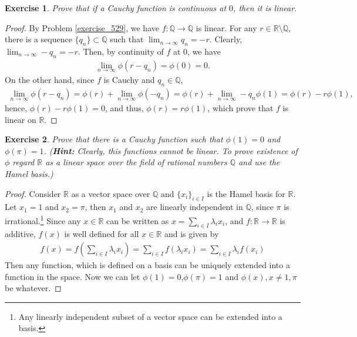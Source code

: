 \documentclass[11pt]{book}
\newtheorem{exercise}{Exercise}[section]
\theoremstyle{definition}
\numberwithin{equation}{chapter}
\begin{document}
\medskip

\begin{exercise}\label{exercise_5210}
Prove that if a Cauchy function is continuous at $0$, then it is linear.
\end{exercise}
\begin{proof}
By Problem \ref{exercise_529}, we have $f: \mathbb{Q} \to \mathbb{Q}$ is linear. For any $r \in \mathbb{R} \setminus \mathbb{Q}$, there is a sequence $\{q_n\} \subset \mathbb{Q}$ such that $\lim_{n\to\infty} q_n = - r$. Clearly, $\lim_{n\to\infty} -q_n = - r$. Then, by continuity of $f$ at $0$, we have
\begin{align*}
    \lim_{n\to\infty} \phi(r - q_n) = \phi(0) = 0.
\end{align*}
On the other hand, since $f$ is Cauchy and $q_n \in \mathbb{Q}$,
\begin{align*}
    \lim_{n\to\infty} \phi(r - q_n) = \phi(r) + \lim_{n\to\infty} \phi(-q_n) = \phi(r) + \lim_{n\to\infty} -q_n \phi(1) = \phi(r) - r \phi(1),
\end{align*}
hence, $\phi(r) - r \phi(1) = 0$, and thus, $\phi(r) = r \phi(1)$, which prove that $f$ is linear on $\mathbb{R}$.
\end{proof}

\medskip

\begin{exercise}
Prove that there is a Cauchy function such that $\phi(1)=0$ and $\phi(\pi)=1$. ({\bf Hint:} Clearly, this functions cannot be linear. To prove existence of $\phi$ regard $\mathbb{R}$ as a linear space over the field of rational numbers $\mathbb{Q}$ and use the Hamel basis.)
\end{exercise}
\begin{proof}
Consider $\mathbb{R}$ as a vector space over $\mathbb{Q}$ and $\{x_i\}_{i \in I}$ is the Hamel basis for $\mathbb{R}$. Let $x_1 = 1$ and $x_2 = \pi$, then $x_1$ and $x_2$ are linearly independent in $\mathbb{Q}$, since $\pi$ is irrational.\footnote{Any linearly independent subset of a vector space can be extended into a basis.} Since any $x \in \mathbb{R}$ can be written as $x = \sum_{i\in I} \lambda_i x_i$, and $f: \mathbb{R} \to \mathbb{R}$ is additive, $f(x)$ is well defined for all $x \in \mathbb{R}$ and is given by
\begin{align*}
    f(x) = f\left(\sum_{i\in I} \lambda_i x_i\right) = \sum_{i \in I} f(\lambda_i x_i) = \sum_{i \in I} \lambda_i f(x_i)
\end{align*}
Then any function, which is defined on a basis can be uniquely extended into a function in the space. Now we can let $\phi(1) = 0$,$\phi(\pi) = 1$ and $\phi(x), x \neq 1,\pi$ be whatever.
\end{proof}
\end{document}

